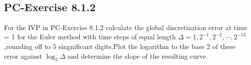\documentclass[11pt]{article}
\begin{document}
    \begin{center}
    \end{center}
    { \hspace*{\fill} \\}
    
    \subsection{PC-Exercise 8.1.2}\label{pc-exercise-8.1.2}

For the IVP in PC-Exercise 8.1.2 calculate the global discretization
error at time = 1 for the Euler method with time steps of equal length
\(\Delta = 1,2^{-1},2^{-2},\cdots,2^{-13}\),rounding off to \(5\)
singnificant digits.Plot the logarithm to the base 2 of these error
against \(\log_2 \Delta\) and determine the slope of the resulting
curve.
\end{document}
